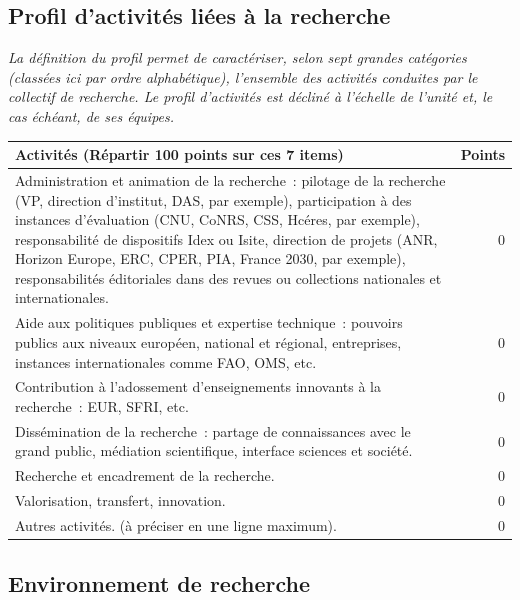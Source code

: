 \documentclass[]{article}
\newcommand{\instructions}[1]{{\em \color{hceresgreen}#1}}
\begin{document}
\subsection{Profil d'activités liées à la recherche}

\instructions{La définition du profil permet de caractériser, selon sept grandes catégories (classées ici par ordre alphabétique), l’ensemble des activités conduites par le collectif de recherche. Le profil d’activités est décliné à l’échelle de l’unité et, le cas échéant, de ses équipes.}

\begin{tabular}{ |p{16cm}|r|  }
\hline
\rowcolor{gray!40}
Activités (Répartir 100 points sur ces 7 items) &  Points   \\
\hline
Administration et animation de la recherche : pilotage de la recherche (VP, direction d’institut, DAS, par exemple), participation à des instances d’évaluation (CNU, CoNRS, CSS, Hcéres, par exemple), responsabilité de dispositifs Idex ou Isite, direction de projets (ANR, Horizon Europe, ERC, CPER, PIA, France 2030, par exemple), responsabilités éditoriales dans des revues ou collections nationales et internationales. & 0 \\
\hline
Aide aux politiques publiques et expertise technique : pouvoirs publics aux niveaux européen, national et régional, entreprises, instances internationales comme FAO, OMS, etc. & 0 \\
\hline
Contribution à l’adossement d’enseignements innovants à la recherche : EUR, SFRI, etc. & 0 \\
Dissémination de la recherche : partage de connaissances avec le grand public, médiation scientifique, interface sciences et société. & 0 \\
\hline
Recherche et encadrement de la recherche. & 0 \\
\hline
Valorisation, transfert, innovation. & 0 \\
\hline
Autres activités. (à préciser en une ligne maximum). & 0 \\
\hline
\end{tabular}

\subsection{Environnement de recherche}
\end{document}
